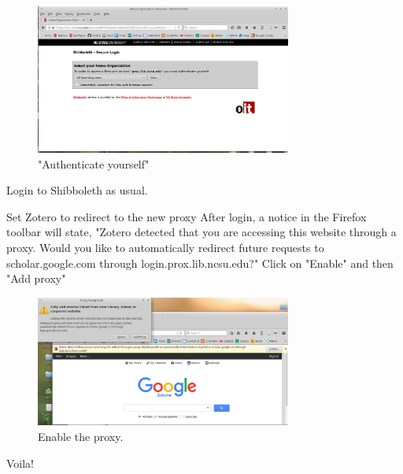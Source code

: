 \documentclass[letterpaper,11pt]{texMemo}
\begin{document}
\begin{outline}[enumerate]
\begin{figure} [!htbp]
  \begin{center}
    \includegraphics[width=0.75\textwidth]{graphics/Screenshot_2017-08-19_09-02-30.png}
    \caption{"Authenticate yourself"}
    \label{fig:}
  \end{center}
\end{figure}

\2 Login to Shibboleth as usual.

\newpage
\1 Set Zotero to redirect to the new proxy
\2 After login, a notice in the Firefox toolbar will state, "Zotero detected that you are accessing this website through a proxy. Would you like to automatically redirect future requests to scholar.google.com through login.prox.lib.ncsu.edu?"
\3 Click on "Enable" and then "Add proxy"

\begin{figure} [!htbp]
  \begin{center}
    \includegraphics[width=0.75\textwidth]{graphics/Screenshot_2017-08-19_12-33-31.png}
    \caption{Enable the proxy.}
    \label{fig:}
  \end{center}
\end{figure}

\end{outline}

Voila!

\autocite{karl_give_2008}

          

\printbibliography
\end{document}
